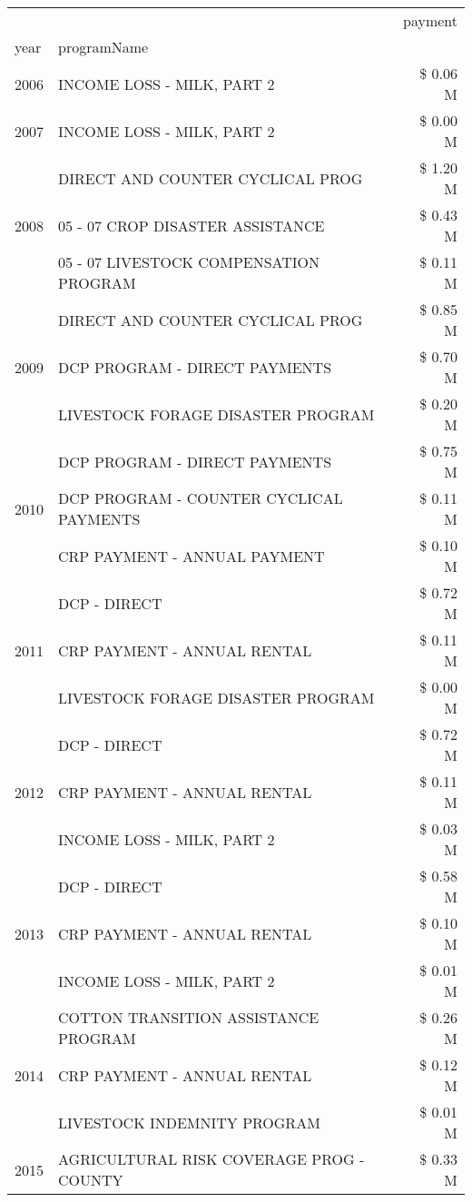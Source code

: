 \begin{tabular}{llr}
\toprule
 &  & payment \\
year & programName &  \\
\midrule
2006 & INCOME LOSS - MILK, PART 2 & \$ 0.06 M \\
\cline{1-3}
2007 & INCOME LOSS - MILK, PART 2 & \$ 0.00 M \\
\cline{1-3}
\multirow[t]{3}{*}{2008} & DIRECT AND COUNTER CYCLICAL PROG & \$ 1.20 M \\
 & 05 - 07 CROP DISASTER ASSISTANCE & \$ 0.43 M \\
 & 05 - 07 LIVESTOCK COMPENSATION PROGRAM & \$ 0.11 M \\
\cline{1-3}
\multirow[t]{3}{*}{2009} & DIRECT AND COUNTER CYCLICAL PROG & \$ 0.85 M \\
 & DCP PROGRAM - DIRECT PAYMENTS & \$ 0.70 M \\
 & LIVESTOCK FORAGE DISASTER  PROGRAM & \$ 0.20 M \\
\cline{1-3}
\multirow[t]{3}{*}{2010} & DCP PROGRAM - DIRECT PAYMENTS & \$ 0.75 M \\
 & DCP PROGRAM - COUNTER CYCLICAL PAYMENTS & \$ 0.11 M \\
 & CRP PAYMENT - ANNUAL PAYMENT & \$ 0.10 M \\
\cline{1-3}
\multirow[t]{3}{*}{2011} & DCP - DIRECT & \$ 0.72 M \\
 & CRP PAYMENT - ANNUAL RENTAL & \$ 0.11 M \\
 & LIVESTOCK FORAGE DISASTER PROGRAM & \$ 0.00 M \\
\cline{1-3}
\multirow[t]{3}{*}{2012} & DCP - DIRECT & \$ 0.72 M \\
 & CRP PAYMENT - ANNUAL RENTAL & \$ 0.11 M \\
 & INCOME LOSS - MILK, PART 2 & \$ 0.03 M \\
\cline{1-3}
\multirow[t]{3}{*}{2013} & DCP - DIRECT & \$ 0.58 M \\
 & CRP PAYMENT - ANNUAL RENTAL & \$ 0.10 M \\
 & INCOME LOSS - MILK, PART 2 & \$ 0.01 M \\
\cline{1-3}
\multirow[t]{3}{*}{2014} & COTTON TRANSITION ASSISTANCE PROGRAM & \$ 0.26 M \\
 & CRP PAYMENT - ANNUAL RENTAL & \$ 0.12 M \\
 & LIVESTOCK INDEMNITY PROGRAM & \$ 0.01 M \\
\cline{1-3}
\multirow[t]{3}{*}{2015} & AGRICULTURAL RISK COVERAGE PROG - COUNTY & \$ 0.33 M \\

\end{tabular}

